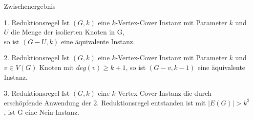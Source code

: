 \documentclass[navbaroff]{sdqbeamer}
\begin{document}
\begin{frame}[t]{}

\end{frame}

\begin{frame}{Zwischenergebnis}
    \begin{grayblock}{1. Reduktionsregel}
        Ist $(G, k)$ eine $k$-Vertex-Cover Instanz mit Parameter $k$ und $U$ die Menge der isolierten Knoten in G, \\ so ist $(G-U, k)$ eine äquivalente Instanz.
    \end{grayblock}
    \begin{grayblock}{2. Reduktionsregel}
        Ist $(G, k)$ eine $k$-Vertex-Cover Instanz mit Parameter $k$ und $v \in V(G)$ Knoten mit $deg(v) \geq k+1$, so ist $(G-v, k-1)$ eine äquivalente Instanz.
    \end{grayblock}
    \begin{grayblock}{3. Reduktionsregel}
        Ist $(G, k)$ eine $k$-Vertex-Cover Instanz die durch erschöpfende Anwendung der 2. Reduktionsregel entstanden ist mit $|E(G)| > k^2$, ist G eine Nein-Instanz.
    \end{grayblock}

\end{frame}
\end{document}
